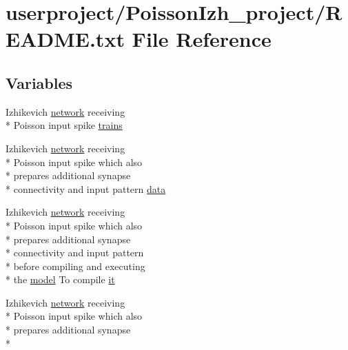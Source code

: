 \hypertarget{userproject_2PoissonIzh__project_2README_8txt}{\section{userproject/\+Poisson\+Izh\+\_\+project/\+R\+E\+A\+D\+M\+E.txt File Reference}
\label{userproject_2PoissonIzh__project_2README_8txt}
}
\subsection*{Variables}
\begin{DoxyCompactItemize}
\item 
Izhikevich \hyperlink{userproject_2Izh__sparse__project_2README_8txt_a3b32176ef4eb1068d5341ffeb475ff7d}{network} receiving \\*
Poisson input spike \hyperlink{userproject_2PoissonIzh__project_2README_8txt_a70fb202ea6a76601f3326d3d09f0ef15}{trains}
\item 
Izhikevich \hyperlink{userproject_2Izh__sparse__project_2README_8txt_a3b32176ef4eb1068d5341ffeb475ff7d}{network} receiving \\*
Poisson input spike which also \\*
prepares additional synapse \\*
connectivity and input pattern \hyperlink{userproject_2PoissonIzh__project_2README_8txt_a5b1aa829e09a57ee007227ad5ed62a3c}{data}
\item 
Izhikevich \hyperlink{userproject_2Izh__sparse__project_2README_8txt_a3b32176ef4eb1068d5341ffeb475ff7d}{network} receiving \\*
Poisson input spike which also \\*
prepares additional synapse \\*
connectivity and input pattern \\*
before compiling and executing \\*
the \hyperlink{README_8txt_a69fd801b7213948c12d9dd7eebb3ed14}{model} To compile \hyperlink{userproject_2PoissonIzh__project_2README_8txt_a3e3bbb6c9b14c38757cf273a117e43e8}{it}
\item 
Izhikevich \hyperlink{userproject_2Izh__sparse__project_2README_8txt_a3b32176ef4eb1068d5341ffeb475ff7d}{network} receiving \\*
Poisson input spike which also \\*
prepares additional synapse \\*

\end{DoxyCompactItemize}
